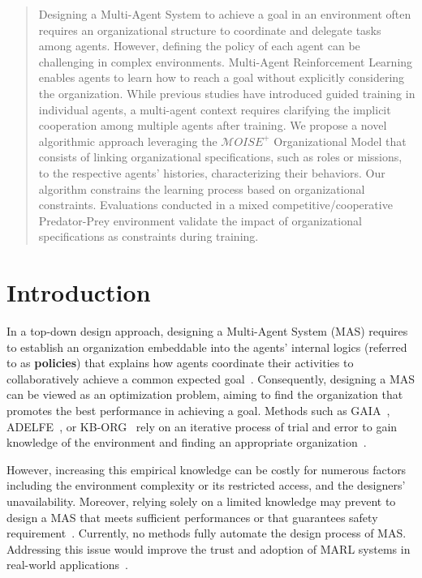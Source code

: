 \documentclass[runningheads]{llncs}
\theoremstyle{freethm}
\theoremstyle{proofoutline}
\begin{document}
\begin{abstract}
    
    Designing a Multi-Agent System to achieve a goal in an environment often requires an organizational structure to coordinate and delegate tasks among agents. However, defining the policy of each agent can be challenging in complex environments. Multi-Agent Reinforcement Learning enables agents to learn how to reach a goal without explicitly considering the organization. While previous studies have introduced guided training in individual agents, a multi-agent context requires clarifying the implicit cooperation among multiple agents after training. We propose a novel algorithmic approach leveraging the $\mathcal{M}OISE^+$ Organizational Model that consists of linking organizational specifications, such as roles or missions, to the respective agents' histories, characterizing their behaviors. Our algorithm constrains the learning process based on organizational constraints. Evaluations conducted in a mixed competitive/cooperative Predator-Prey environment validate the impact of organizational specifications as constraints during training.

\end{abstract}


\section{Introduction}

In a top-down design approach, designing a Multi-Agent System (MAS) requires to establish an organization embeddable into the agents' internal logics (referred to as \textbf{policies}) that explains how agents coordinate their activities to collaboratively achieve a common expected goal~\cite{Picard2009}.
%
Consequently, designing a MAS can be viewed as an optimization problem, aiming to find the organization that promotes the best performance in achieving a goal. Methods such as GAIA~\cite{Wooldridge2000,Cernuzzi2014}, ADELFE~\cite{Mefteh2015}, or KB-ORG~\cite{Sims2008} rely on an iterative process of trial and error to gain knowledge of the environment and finding an appropriate organization~\cite{Sims2008}.

However, increasing this empirical knowledge can be costly for numerous factors including the environment complexity or its restricted access, and the designers' unavailability. Moreover, relying solely on a limited knowledge may prevent to design a MAS that meets sufficient performances or that guarantees safety requirement~\cite{Mefteh2013}. Currently, no methods fully automate the design process of MAS. Addressing this issue would improve the trust and adoption of MARL systems in real-world applications~\cite{kok2006collaborative,omidshafiei2019learning}.
\end{document}

